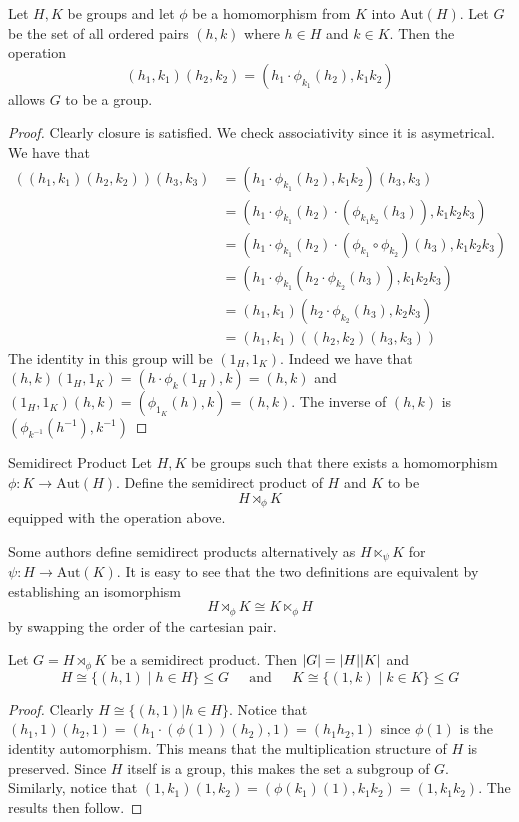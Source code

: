 \documentclass[a4paper]{article}
\begin{document}
\begin{prp}{}{} Let $H,K$ be groups and let $\phi$ be a homomorphism from $K$ into $\text{Aut}(H)$. Let $G$ be the set of all ordered pairs $(h,k)$ where $h\in H$ and $k\in K$. Then the operation $$(h_1,k_1)(h_2,k_2)=\left(h_1\cdot\phi_{k_1}(h_2),k_1k_2\right)$$ allows $G$ to be a group. 
\begin{proof}
Clearly closure is satisfied. We check associativity since it is asymetrical. We have that 
\begin{align*}
((h_1,k_1)(h_2,k_2))(h_3,k_3)&=\left(h_1\cdot\phi_{k_1}(h_2),k_1k_2\right)(h_3,k_3)\\
&=(h_1\cdot\phi_{k_1}(h_2)\cdot(\phi_{k_1k_2}(h_3)),k_1k_2k_3)\\
&=(h_1\cdot\phi_{k_1}(h_2)\cdot(\phi_{k_1}\circ\phi_{k_2})(h_3),k_1k_2k_3)\\
&=(h_1\cdot\phi_{k_1}(h_2\cdot\phi_{k_2}(h_3)),k_1k_2k_3)\\
&=(h_1,k_1)(h_2\cdot\phi_{k_2}(h_3),k_2k_3)\\
&=(h_1,k_1)((h_2,k_2)(h_3,k_3))
\end{align*}
The identity in this group will be $(1_H,1_K)$. Indeed we have that $(h,k)(1_H,1_K)=(h\cdot\phi_{k}(1_H),k)=(h,k)$ and $(1_H,1_K)(h,k)=(\phi_{1_K}(h),k)=(h,k)$. The inverse of $(h,k)$ is $(\phi_{k^{-1}}(h^{-1}),k^{-1})$
\end{proof}
\end{prp}

\begin{defn}{Semidirect Product}{} Let $H,K$ be groups such that there exists a homomorphism $\phi:K\to\text{Aut}(H)$. Define the semidirect product of $H$ and $K$ to be $$H\rtimes_\phi K$$ equipped with the operation above. 
\end{defn}

Some authors define semidirect products alternatively as $H\ltimes_\psi K$ for $\psi:H\to\text{Aut}(K)$. It is easy to see that the two definitions are equivalent by establishing an isomorphism $$H\rtimes_\phi K\cong K\ltimes_\phi H$$ by swapping the order of the cartesian pair. 

\begin{thm}{}{} Let $G=H\rtimes_\phi K$ be a semidirect product. Then $\abs{G}=\abs{H}\abs{K}$ and $$H\cong\{(h,1)\;|\;h\in H\}\leq G\;\;\;\;\text{ and }\;\;\;\;K\cong\{(1,k)\;|\;k\in K\}\leq G$$ 
\begin{proof}
Clearly $H\cong\{(h,1)|h\in H\}$. Notice that $(h_1,1)(h_2,1)=(h_1\cdot(\phi(1))(h_2),1)=(h_1h_2,1)$ since $\phi(1)$ is the identity automorphism. This means that the multiplication structure of $H$ is preserved. Since $H$ itself is a group, this makes the set a subgroup of $G$. \\

Similarly, notice that $(1,k_1)(1,k_2)=(\phi(k_1)(1),k_1k_2)=(1,k_1k_2)$. The results then follow. 
\end{proof}
\end{thm}
\end{document}
